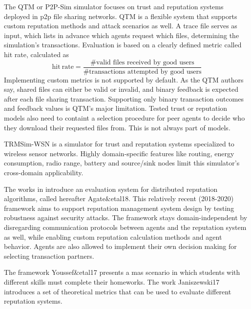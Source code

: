 \documentclass[%
    ]{\PathToTumTemplate/thesis/tum_thesis}
\begin{document}
The QTM or P2P-Sim simulator focuses on trust and reputation systems deployed in \gls{p2p} file sharing networks.
QTM is a flexible system that supports custom reputation methods and attack scenarios as well.
A trace file serves as input, which lists in advance which agents request which files, determining the simulation's transactions.
Evaluation is based on a clearly defined metric called hit rate, calculated as
\begin{equation}
\mathrm{hit~rate}=\frac{\text{\# valid files received by good users}}{\text{\# transactions attempted by good users}}
\end{equation}
Implementing custom metrics is not supported by default.
As the QTM authors say, shared files can either be valid or invalid, and binary feedback is expected after each file sharing transaction.
Supporting only binary transaction outcomes and feedback values is QTM's major limitation.
Tested trust or reputation models also need to containt a selection procedure for peer agents to decide who they download their requested files from.
This is not always part of models.

TRMSim-WSN is a simulator for trust and reputation systems specialized to wireless sensor networks.
Highly domain-specific features like routing, energy consumption, radio range, battery and source/sink nodes limit this simulator's cross-domain applicability.

The works in \cite{agate_platform_2018,agate_reputation_2020} introduce an evaluation system for distributed reputation algorithms, called hereafter Agate\&etal18.
This relatively recent (2018-2020) framework aims to support reputation management system design by testing robustness against security attacks.
The framework stays domain-independent by disregarding communication protocols between agents and the reputation system as well, while enabling custom reputation calculation methods and agent behavior.
Agents are also allowed to implement their own decision making for selecting transaction partners.

The framework Youssef\&etal17 presents a \gls{mas} scenario in which students with different skills must complete their homeworks\cite{youssef_towards_2017}.
The work Janiszewski17 introduces a set of theoretical metrics that can be used to evaluate different reputation systems\cite{janiszewski_towards_2017}.



\end{document}
